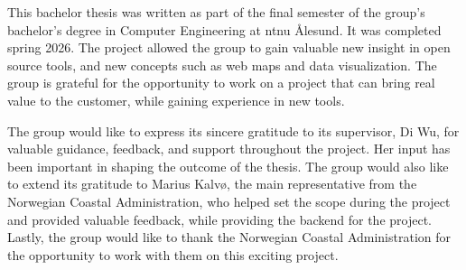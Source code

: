 
This bachelor thesis was written as part of the final semester of the group's bachelor's degree in Computer Engineering at \acrshort{ntnu} Ålesund. It was completed spring 2026. The project allowed the group to gain valuable new insight in open source tools, and new concepts such as web maps and data visualization. The group is grateful for the opportunity to work on a project that can bring real value to the customer, while gaining experience in new tools.

The group would like to express its sincere gratitude to its supervisor, Di Wu, for valuable guidance, feedback, and support throughout the project. Her input has been important in shaping the outcome of the thesis. The group would also like to extend its gratitude to Marius Kalvø, the main representative from the Norwegian Coastal Administration, who helped set the scope during the project and provided valuable feedback, while providing the backend for the project. Lastly, the group would like to thank the Norwegian Coastal Administration for the opportunity to work with them on this exciting project.

